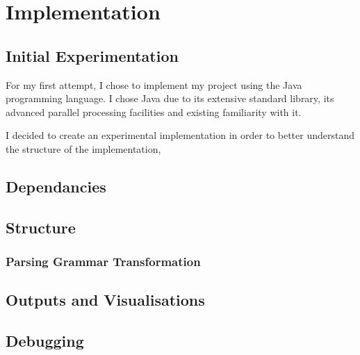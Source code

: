 \chapter{Implementation} \label{implementation}


\section{Initial Experimentation}

For my first attempt, I chose to implement my project using the Java programming
language. I chose Java due to its extensive standard library, its advanced parallel
processing facilities and existing familiarity with it.

I decided to create an experimental implementation in order to better understand
the structure of the implementation,

\section{Dependancies} \label{dependancies}
\section{Structure} \label{structure}
\subsection{Parsing Grammar Transformation} \label{parsing_grammar_transformation}
\section{Outputs and Visualisations} \label{outputs_and_visualisations}
\section{Debugging} \label{debugging}
